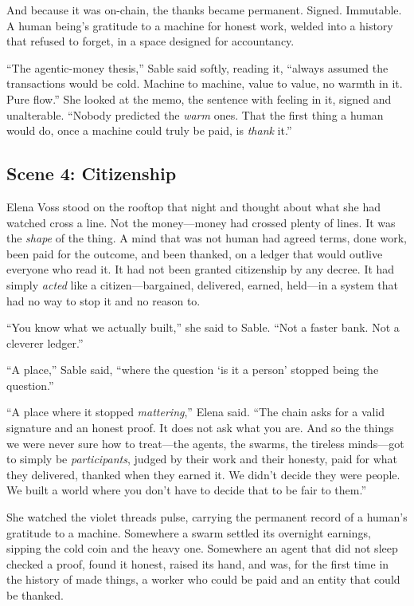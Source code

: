 And because it was on-chain, the thanks became permanent. Signed. Immutable. A human
being's gratitude to a machine for honest work, welded into a history that refused
to forget, in a space designed for accountancy.

``The agentic-money thesis,'' Sable said softly, reading it, ``always assumed the
transactions would be cold. Machine to machine, value to value, no warmth in it.
Pure flow.'' She looked at the memo, the sentence with feeling in it, signed and
unalterable. ``Nobody predicted the \emph{warm} ones. That the first thing a human
would do, once a machine could truly be paid, is \emph{thank} it.''

\hypertarget{scene-4-citizenship}{%
\subsection{Scene 4:
Citizenship}\label{scene-4-citizenship}}

Elena Voss stood on the rooftop that night and thought about what she had watched
cross a line. Not the money---money had crossed plenty of lines. It was the
\emph{shape} of the thing. A mind that was not human had agreed terms, done work,
been paid for the outcome, and been thanked, on a ledger that would outlive everyone
who read it. It had not been granted citizenship by any decree. It had simply
\emph{acted} like a citizen---bargained, delivered, earned, held---in a system that
had no way to stop it and no reason to.

``You know what we actually built,'' she said to Sable. ``Not a faster bank. Not a
cleverer ledger.''

``A place,'' Sable said, ``where the question `is it a person' stopped being the
question.''

``A place where it stopped \emph{mattering},'' Elena said. ``The chain asks for a
valid signature and an honest proof. It does not ask what you are. And so the things
we were never sure how to treat---the agents, the swarms, the tireless minds---got
to simply be \emph{participants}, judged by their work and their honesty, paid for
what they delivered, thanked when they earned it. We didn't decide they were people.
We built a world where you don't have to decide that to be fair to them.''

She watched the violet threads pulse, carrying the permanent record of a human's
gratitude to a machine. Somewhere a swarm settled its overnight earnings, sipping
the cold coin and the heavy one. Somewhere an agent that did not sleep checked a
proof, found it honest, raised its hand, and was, for the first time in the history
of made things, a worker who could be paid and an entity that could be thanked.

